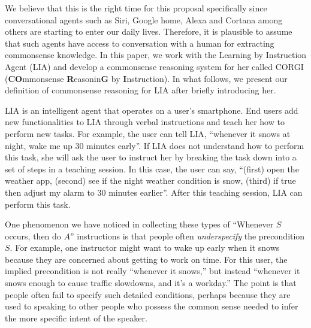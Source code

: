 We believe that this is the right time for this proposal specifically since conversational agents such as Siri, Google home, Alexa and Cortana among others are starting to enter our daily lives. Therefore, it is plausible to assume that 
such agents %
have access to conversation with a human for extracting commonsense knowledge. In this paper, we work with the Learning by Instruction Agent (LIA) \citep{azaria2016instructable,labutov2018lia} and develop a commonsense reasoning system for her called CORGI (\textbf{CO}mmonsense \textbf{R}easonin\textbf{G} by \textbf{I}nstruction). In what follows, we present our definition of commonsense reasoning for LIA after briefly introducing her. %

LIA is an intelligent agent that operates on 
a user's smartphone. %
End users add new functionalities to LIA through verbal instructions and teach her how to perform new tasks. For example, the user can tell LIA, ``whenever it snows at night, wake me up 30 minutes early''. If LIA does not understand how to perform this task, she will ask the user to instruct her by breaking the task down into a set of steps in a teaching session. In this case, the user can say, ``(first) open the weather app, (second) see if the night weather condition is snow, (third) if true then adjust my alarm to 30 minutes earlier''. After this teaching session, LIA can perform this task. 

One phenomenon we have noticed in collecting these types of ``Whenever $S$ occurs, then do $A$'' instructions is that people often {\em underspecify} the precondition $S$. For example, one instructor might want to wake up early when it snows because they are concerned about getting to work on time.  For this user, the implied precondition is not really ``whenever it snows,'' but instead ``whenever it snows enough to cause traffic slowdowns, and it's a workday.'' The point is %
that people often fail to specify  such detailed conditions, perhaps because they are used to speaking to other people who possess the common sense needed to infer the more specific intent of the speaker.

